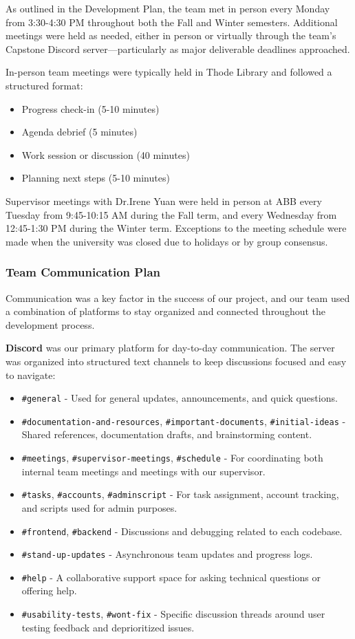 \documentclass{article}
\begin{document}
As outlined in the Development Plan, the team met in person every Monday from 3:30-4:30 PM throughout both the Fall and Winter semesters. Additional meetings were held as needed, either in person or virtually through the team's Capstone Discord server—particularly as major deliverable deadlines approached.

In-person team meetings were typically held in Thode Library and followed a structured format:
\begin{itemize}
    \item Progress check-in (5-10 minutes)
    \item Agenda debrief (5 minutes)
    \item Work session or discussion (40 minutes)
    \item Planning next steps (5-10 minutes)
\end{itemize}
Supervisor meetings with Dr.Irene Yuan were held in person at ABB every Tuesday from 9:45-10:15 AM during the Fall term, and every Wednesday from 12:45-1:30 PM during the Winter term. Exceptions to the meeting schedule were made when the university was closed due to holidays or by group consensus.

\subsubsection{Team Communication Plan}

Communication was a key factor in the success of our project, and our team used a combination of platforms to stay organized and connected throughout the development process.

\textbf{Discord} was our primary platform for day-to-day communication. The server was organized into structured text channels to keep discussions focused and easy to navigate:
\begin{itemize}
    \item \texttt{\#general} - Used for general updates, announcements, and quick questions.
    \item \texttt{\#documentation-and-resources}, \texttt{\#important-documents}, 
    \texttt{\#initial-ideas} - Shared references, documentation drafts, and brainstorming content.
    \item \texttt{\#meetings}, \texttt{\#supervisor-meetings}, \texttt{\#schedule} 
    - For coordinating both internal team meetings and meetings with our supervisor.
    \item \texttt{\#tasks}, \texttt{\#accounts}, \texttt{\#adminscript} 
    - For task assignment, account tracking, and scripts used for admin purposes.
    \item \texttt{\#frontend}, \texttt{\#backend} 
    - Discussions and debugging related to each codebase.
    \item \texttt{\#stand-up-updates} - Asynchronous team updates and progress logs.
    \item \texttt{\#help} - A collaborative support space for asking technical questions or offering help.
    \item \texttt{\#usability-tests}, \texttt{\#wont-fix} - Specific discussion threads around user testing feedback and deprioritized issues.
\end{itemize}
\end{document}
